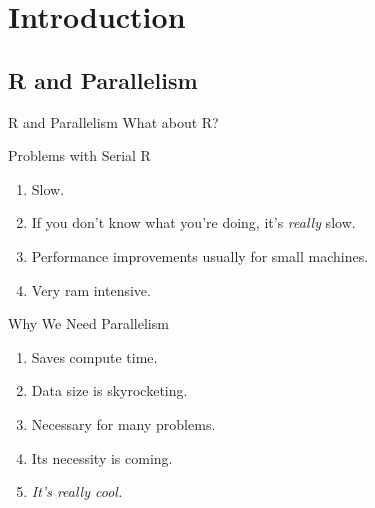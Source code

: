 \section{Introduction}
\makesubcontentsslides


% 


% 



\subsection{R and Parallelism}


\begin{frame}
  \begin{block}{R and Parallelism}\pause
  What about R?
  \end{block}
\end{frame}

\begin{frame}
  \begin{block}{Problems with Serial R}\pause
  \begin{enumerate}[<+-|alert@+>]
    \item Slow.
    \item If you don't know what you're doing, it's \emph{really} slow.
    \item Performance improvements usually for small machines.
    \item Very ram intensive.
  \end{enumerate}
  \end{block}
\end{frame}


\begin{frame}
  \begin{block}{Why We Need Parallelism}\pause
    \begin{enumerate}[<+-|alert@+>]
      \item Saves compute time.
      \item Data size is skyrocketing.
      \item Necessary for many problems.
      \item Its necessity is coming.
      \item \emph{It's really cool.}
  \end{enumerate}
  \end{block}
\end{frame}

